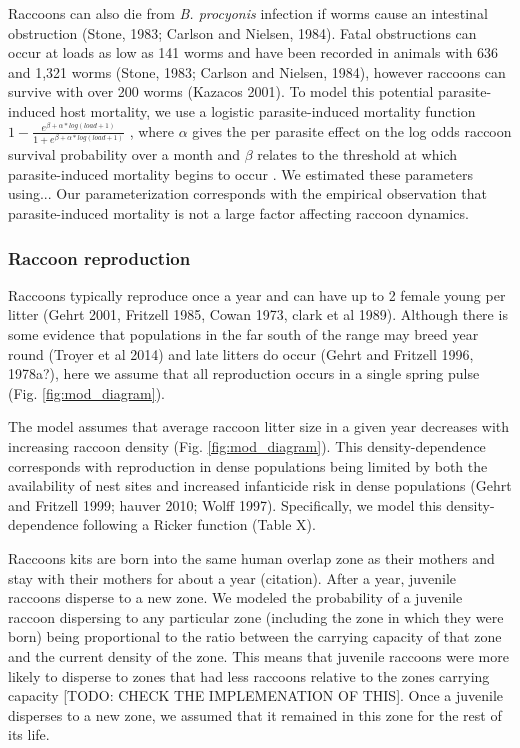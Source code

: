 \documentclass[11pt]{article}
\begin{document}
Raccoons can also die from \emph{B. procyonis} infection if worms cause
an intestinal obstruction (Stone, 1983; Carlson and Nielsen, 1984).
Fatal obstructions can occur at loads as low as 141 worms and have been
recorded in animals with 636 and 1,321 worms (Stone, 1983; Carlson and
Nielsen, 1984), however raccoons can survive with over 200 worms
(Kazacos 2001). To model this potential parasite-induced host mortality,
we use a logistic parasite-induced mortality function
\(1 - \frac{e^{\beta + \alpha*log(load + 1)}}{1 + e^{\beta + \alpha*log(load + 1)}}\)
, where $\alpha$ gives the per parasite effect on the log
odds raccoon survival probability over a month and $\beta$ relates to the threshold at which parasite-induced mortality begins
to occur \citep{Wilber2016}. We estimated these parameters using... Our parameterization corresponds with the empirical observation that parasite-induced mortality is not a large factor affecting raccoon dynamics.

\subsubsection{Raccoon reproduction}

Raccoons typically reproduce once a year and can have up to 2 female
young per litter (Gehrt 2001, Fritzell 1985, Cowan 1973, clark et al
1989). Although there is some evidence that populations in the far south
of the range may breed year round (Troyer et al 2014) and late litters
do occur (Gehrt and Fritzell 1996, 1978a?), here we assume that all
reproduction occurs in a single spring pulse (Fig. \ref{fig:mod_diagram}).

The model assumes that average raccoon litter size in a given year
decreases with increasing raccoon density (Fig. \ref{fig:mod_diagram}). This density-dependence
corresponds with reproduction in dense populations being limited by both
the availability of nest sites and increased infanticide risk in dense
populations (Gehrt and Fritzell 1999; hauver 2010; Wolff 1997).
Specifically, we model this density-dependence following a Ricker
function (Table X).

Raccoons kits are born into the same human overlap zone as their mothers and stay with their mothers for about a year (citation).  After a year, juvenile raccoons disperse to a new zone. We modeled the probability of a juvenile raccoon dispersing to any particular zone (including the zone in which they were born) being proportional to the ratio between the carrying capacity of that zone and the current density of the zone. This means that juvenile raccoons were more likely to disperse to zones that had less raccoons relative to the zones carrying capacity [TODO: CHECK THE IMPLEMENATION OF THIS].  Once a juvenile disperses to a new zone, we assumed that it remained in this zone for the rest of its life. 
\end{document}
